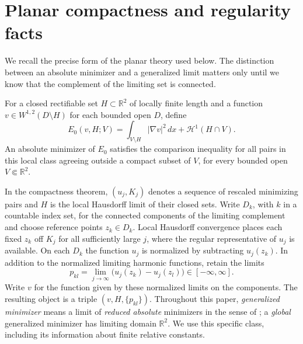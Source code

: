 \section{Planar compactness and regularity facts}
\label{sec:known-facts}

We recall the precise form of the planar theory used below.  The distinction
between an absolute minimizer and a generalized limit matters only until we
know that the complement of the limiting set is connected.

For a closed rectifiable set $H\subset\mathbb R^2$ of locally finite length and a
function $v\in W^{1,2}(D\setminus H)$ for each bounded open $D$, define
\[
 E_0(v,H;V)=\int_{V\setminus H}|\nabla v|^2\,dx
                 +\mathcal H^1(H\cap V).
\]
An absolute minimizer of $E_0$ satisfies the comparison inequality for
all pairs in this local class agreeing outside a compact subset of $V$,
for every bounded open $V\Subset\mathbb R^2$.

In the compactness theorem, $(u_j,K_j)$ denotes a sequence of rescaled
minimizing pairs and $H$ is the local Hausdorff limit of their closed sets.
Write $D_k$, with $k$ in a countable index set, for the connected components of the limiting complement and choose
reference points $z_k\in D_k$.  Local Hausdorff convergence places each
fixed $z_k$ off $K_j$ for all sufficiently large $j$, where the regular
representative of $u_j$ is available.  On each $D_k$ the function $u_j$ is normalized
by subtracting $u_j(z_k)$.  In addition to the normalized
limiting harmonic functions, retain the limits
\[
 p_{kl}=\lim_{j\to\infty}\bigl(u_j(z_k)-u_j(z_l)\bigr)
 \in[-\infty,\infty].
\]
Write $v$ for the function given by these normalized limits on the
components.  The resulting object is a triple $(v,H,\{p_{kl}\})$.  Throughout this paper,
\emph{generalized minimizer} means a limit of \emph{reduced absolute} minimizers in the
sense of \cite[Definition~2.2.4]{delellis_focardi2025}; a \emph{global}
generalized minimizer has limiting domain $\mathbb R^2$.  We use this specific
class, including its information about finite relative constants.

